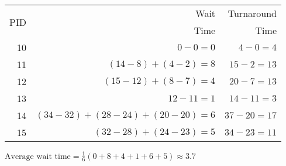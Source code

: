\documentclass{article}
\begin{document}
\begin{table}[H]
  \centering
  \begin{tabular}{r|rr}
    \toprule
    \multirow{2}{*}{PID} & Wait      & Turnaround \\
            & Time      & Time       \\
    \midrule
    10      & $ 0-0 =0$ & $ 4-0 =4 $ \\
    11      & $ (14-8)+(4-2) =8$ & $ 15-2 =13 $ \\
    12      & $ (15-12)+(8-7) =4$ & $20-7 =13$ \\
    13      & $12-11=1$ & $14-11=3 $ \\
    14      & $(34-32)+(28-24)+(20-20)=6$ & $37-20=17$ \\
    15      & $(32-28)+(24-23)=5$ & $34-23=11$ \\
    \bottomrule
  \end{tabular}
\end{table}
$\text{Average wait time} = \frac{1}{6}(0+8+4+1+6+5)\approx3.7$
\end{document}
